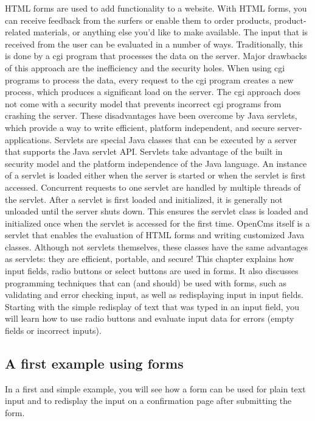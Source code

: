 HTML forms are used to add functionality to a website. With HTML forms,
you can receive feedback from the surfers or enable them to order
products, product-related materials, or anything else you'd like to make
available.
The input that is received from the user can be evaluated in a number of
ways. Traditionally, this is done by a cgi program that processes the
data on the server. Major drawbacks of this approach are the
inefficiency and the security holes. When using cgi programs to process
the data, every request to the cgi program creates a new process, which
produces a significant load on the server. The cgi approach
does not come with a security model that prevents incorrect cgi programs
from crashing the server.
These disadvantages have been overcome by Java servlets, which provide a
way to write efficient, platform independent, and secure
server-applications. Servlets are special Java classes that can be
executed by a server that supports the Java servlet API. Servlets take
advantage of the built in security model and the platform independence
of the Java language. An instance of a servlet is loaded either when the
server is started or when the servlet is first accessed. 
Concurrent requests to one servlet
are handled by multiple threads of the servlet. After a servlet is first
loaded and initialized, it is generally not unloaded until the server
shuts down. This ensures the servlet class is loaded and initialized
once when the servlet is accessed for the first time.
OpenCms itself is a servlet that enables the evaluation of HTML forms and
writing customized Java classes. Although not servlets themselves, these
classes have the same advantages as servlets: they are efficient,
portable, and secure!
This chapter explains how input fields, radio buttons or select buttons
are used in forms. It also discusses programming techniques that can
(and should) be used with forms, such as validating and error checking
input, as well as redisplaying input in input fields. Starting with the
simple redisplay of text that was typed in an input field, you will
learn how to use radio buttons and evaluate input data for errors
(empty fields or incorrect inputs).


\subsection {A first example using forms}

In a first and simple example, you will see how a form can be used for
plain text input and to redisplay the input on a confirmation page
after submitting the form.

